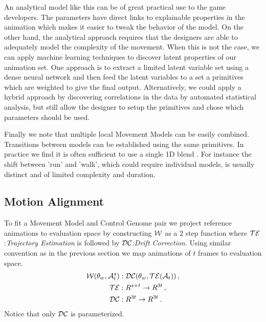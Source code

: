 An analytical model like this can be of great practical use to the game developers. The parameters have direct links to explainable properties in the animation which makes it easier to tweak the behavior of the model. On the other hand, the analytical approach requires that the designers are able to adequately model the complexity of the movement. 
%
When this is not the case, we can apply machine learning techniques to discover latent properties of our animation set. %
One approach is to extract a limited latent variable set using a dense neural network and then feed the latent variables to a set a primitives which are weighted to give the final output. 
Alternatively, we could apply a hybrid approach by discovering correlations in the data by automated statistical analysis, but still allow the designer to setup the primitives and chose which parameters should be used. 

Finally we note that multiple local Movement Models can be easily combined. Transitions between models can be established using the same primitives. In practice we find it is often sufficient to use a single 1D blend . For instance the shift between 'run' and 'walk', which could require individual models, is usually distinct and of limited complexity and duration. 

\subsection{Motion Alignment}
To fit a Movement Model and Control Genome pair we project reference animations to evaluation space by constructing $\mathcal{W}$ as a 2 step function where $\mathcal{TE}$:\textit{Trajectory Estimation} is followed by $\mathcal{DC}$:\textit{Drift Correction}. Using similar convention as in the previous section we map animations of $t$ frames to evaluation space. 
\begin{subequations}
\begin{align}
    \mathcal{W}(\theta_{w},\mathcal{A}_{t}^{s})&:\mathcal{DC}(\theta_{w},\mathcal{TE}(\mathcal{A}_t)) \,,\\
    \mathcal{TE}&:R^{s\times{t}} \rightarrow  R^{3t} \,,\\
    \mathcal{DC}&:R^{3t} \rightarrow R^{3t} \,.
\end{align}
\end{subequations}
Notice that only $\mathcal{DC}$ is parameterized.


